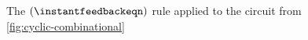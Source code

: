 \begin{figure}
    \centering
    \caption{
        The \((\instantfeedbackeqn)\) rule applied to the circuit from
        \cref{fig:cyclic-combinational}
    }
    \label{fig:cyclic-combinational-unrolled}
\end{figure}